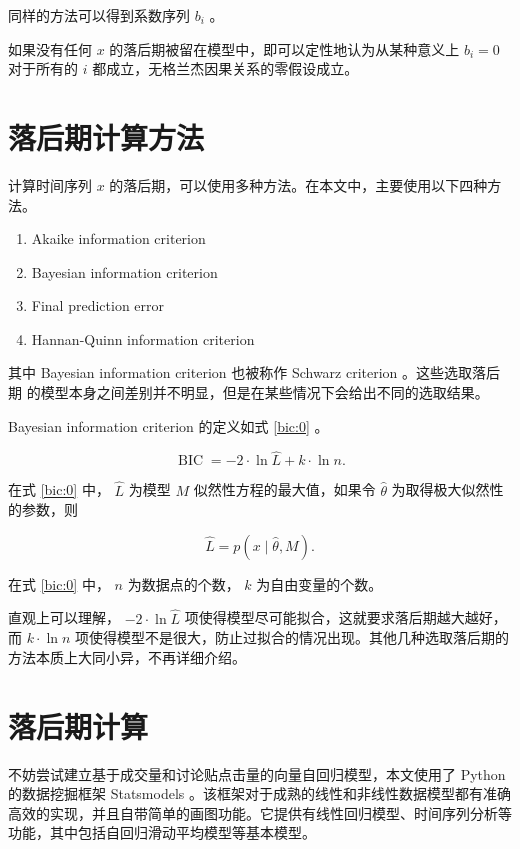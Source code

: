 同样的方法可以得到系数序列 $b_{i}$ 。

如果没有任何 $x$ 的落后期被留在模型中，即可以定性地认为从某种意义上 $b_{i}=0$
对于所有的 ${i}$ 都成立，无格兰杰因果关系的零假设成立。

\section{落后期计算方法}

计算时间序列 $x$ 的落后期，可以使用多种方法。在本文中，主要使用以下四种方法。

\begin{enumerate}
  \item Akaike information criterion
  \item Bayesian information criterion
  \item Final prediction error
  \item Hannan-Quinn information criterion
\end{enumerate}

其中 Bayesian information criterion 也被称作 Schwarz criterion 。这些选取落后期
的模型本身之间差别并不明显，但是在某些情况下会给出不同的选取结果。

Bayesian information criterion 的定义如式 \ref{bic:0} 。

\begin{equation}
  \label{bic:0}
  \operatorname{BIC}=-2\cdot \ln \hat{L}+k\cdot \ln n.
\end{equation}

在式 \ref{bic:0} 中， $\hat{L}$ 为模型 $M$ 似然性方程的最大值，如果令 $\hat{\theta}$ 为取得极大似然性的参数，则

\begin{equation}
  \label{bic:1}
  \hat{L}=p(x\mid \hat{\theta},M).
\end{equation}

在式 \ref{bic:0} 中， $n$ 为数据点的个数， $k$ 为自由变量的个数。

直观上可以理解， $-2\cdot \ln \hat{L}$ 项使得模型尽可能拟合，这就要求落后期越大越好，而 $k\cdot \ln n$ 项使得模型不是很大，防止过拟合的情况出现。其他几种选取落后期的方法本质上大同小异，不再详细介绍。

\section{落后期计算}

不妨尝试建立基于成交量和讨论贴点击量的向量自回归模型，本文使用了 Python 的数据挖掘框架 Statsmodels\cite{statsmodels} 。该框架对于成熟的线性和非线性数据模型都有准确高效的实现，并且自带简单的画图功能。它提供有线性回归模型、时间序列分析等功能，其中包括自回归滑动平均模型等基本模型。

